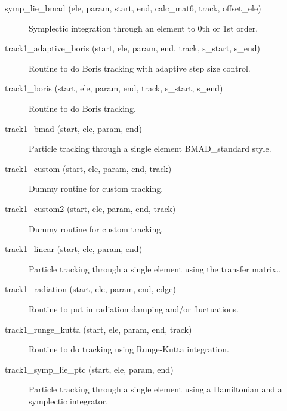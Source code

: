 \begin{description}

\label{r:symp.lie.bmad}
\item[symp_lie_bmad (ele, param, start, end, calc_mat6, track, offset_ele)] \Newline
Symplectic integration through an element to 0th or 1st order.

\label{r:track1.adaptive.boris}
\item[track1_adaptive_boris (start, ele, param, end, track, s_start, s_end)] \Newline
Routine to do Boris tracking with adaptive step size control. 

\label{r:track1.boris}
\item[track1_boris (start, ele, param, end, track, s_start, s_end)] \Newline
Routine to do Boris tracking.  

\label{r:track1.bmad}
\item[track1_bmad (start, ele, param, end)] \Newline
Particle tracking through a single element BMAD_standard style. 

\label{r:track1.custom}
\item[track1_custom (start, ele, param, end, track)] \Newline
Dummy routine for custom tracking.

\label{r:track1.custom2}
\item[track1_custom2 (start, ele, param, end, track)] \Newline
Dummy routine for custom tracking.

\label{r:track1.linear}
\item[track1_linear (start, ele, param, end)] \Newline
Particle tracking through a single element using the transfer matrix.. 

\label{r:track1.radiation}
\item[track1_radiation (start, ele, param, end, edge)] \Newline
Routine to put in radiation damping and/or fluctuations. 

\label{r:track1.runge.kutta}
\item[track1_runge_kutta (start, ele, param, end, track)] \Newline
Routine to do tracking using Runge-Kutta integration. 

\label{r:track1.symp.lie.ptc}
\item[track1_symp_lie_ptc (start, ele, param, end)] \Newline
Particle tracking through a single element using a Hamiltonian and a 
symplectic integrator. 


\end{description}
